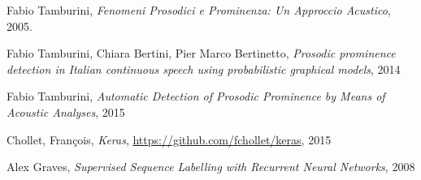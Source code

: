 \documentclass[twoside,twocolumn,10pt]{extarticle}
\theoremstyle{definition}
\begin{document}
\begin{thebibliography}{99}	
		Fabio Tamburini,
		\newblock \emph{Fenomeni Prosodici e Prominenza: Un Approccio Acustico},
		2005.

		Fabio Tamburini, Chiara Bertini, Pier Marco Bertinetto,
		\newblock \emph{Prosodic prominence detection in Italian continuous speech using probabilistic graphical models},
		2014

		Fabio Tamburini,
		\newblock \emph{Automatic Detection of Prosodic Prominence by Means of Acoustic Analyses},
		2015

		Chollet, Fran\c{c}ois,
		\newblock \emph{Keras},
		\url{https://github.com/fchollet/keras},
		2015

		Alex Graves,
		\newblock \emph{Supervised Sequence Labelling with Recurrent Neural Networks},
		2008
\end{thebibliography}
\end{document}
